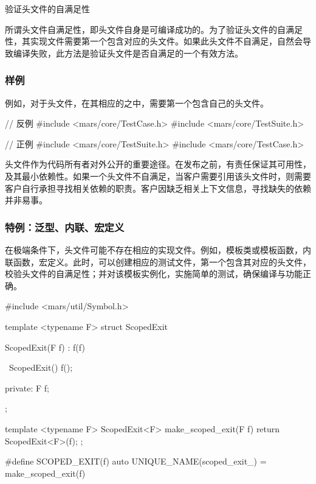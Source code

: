 \begin{content}
\begin{episode}{验证头文件的自满足性}
\begin{content}
所谓头文件自满足性，即头文件自身是可编译成功的。为了验证头文件的自满足性，其实现文件需要第一个包含对应的头文件。如果此头文件不自满足，自然会导致编译失败，此方法是验证头文件是否自满足的一个有效方法。

\subsubsection{样例}

例如，对于头文件，在其相应的之中，需要第一个包含自己的头文件。

\begin{inlinediff}
 \begin{minicpp}
// 反例
#include <mars/core/TestCase.h>
#include <mars/core/TestSuite.h>
 \end{minicpp} 
\tcblower
 \begin{minicpp}
// 正例
#include <mars/core/TestSuite.h>
#include <mars/core/TestCase.h>
 \end{minicpp} 
\end{inlinediff}

头文件作为代码所有者对外公开的重要途径。在发布之前，有责任保证其可用性，及其最小依赖性。如果一个头文件不自满足，当客户需要引用该头文件时，则需要客户自行承担寻找相关依赖的职责。客户因缺乏相关上下文信息，寻找缺失的依赖并非易事。

\subsubsection{特例：泛型、内联、宏定义}

在极端条件下，头文件可能不存在相应的实现文件。例如，模板类或模板函数，内联函数，宏定义。此时，可以创建相应的测试文件，第一个包含其对应的头文件，校验头文件的自满足性；并对该模板实例化，实施简单的测试，确保编译与功能正确。

\begin{c++}[title={\ttfamily{实现ScopedExit：include/mars/util/ScopedExit.h}}]
#include <mars/util/Symbol.h>

template <typename F>
struct ScopedExit {
  ScopedExit(F f) : f(f) {
  }

  ~ScopedExit() { 
    f(); 
  }

private:
  F f;
};

template <typename F>
ScopedExit<F> make_scoped_exit(F f) {
  return ScopedExit<F>(f);
};

#define SCOPED_EXIT(f) auto UNIQUE_NAME(scoped_exit_) = make_scoped_exit(f)
\end{c++}


\end{content}
\end{episode}
\end{content}

